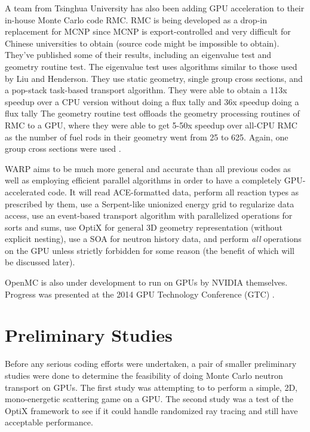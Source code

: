 A team from Tsinghua University has also been adding GPU acceleration to their in-house Monte Carlo code RMC. RMC is being developed as a drop-in replacement for MCNP since MCNP is export-controlled and very difficult for Chinese universities to obtain (source code might be impossible to obtain).  They've published some of their results, including an eigenvalue test and geometry routine test.  The eigenvalue test uses algorithms similar to those used by Liu and Henderson.  They use static geometry, single group cross sections, and a pop-stack task-based transport algorithm.  They were able to obtain a 113x speedup over a CPU version without doing a flux tally and 36x speedup doing a flux tally \cite{qixu_ans_winter}   The geometry routine test offloads the geometry processing routines of RMC to a GPU, where they were able to get 5-50x speedup over all-CPU RMC as the number of fuel rods in their geometry went from 25 to 625.  Again, one group cross sections were used \cite{qixu}.

WARP aims to be much more general and accurate than all previous codes as well as employing efficient parallel algorithms in order to have a completely GPU-accelerated code.  It will read ACE-formatted data, perform all reaction types as prescribed by them, use a Serpent-like unionized energy grid to regularize data access, use an event-based transport algorithm with parallelized operations for sorts and sums, use OptiX for general 3D geometry representation (without explicit nesting), use a SOA for neutron history data, and perform \emph{all} operations on the GPU unless strictly forbidden for some reason (the benefit of which will be discussed later).
	
OpenMC is also under development to run on GPUs by NVIDIA themselves.  Progress was presented at the 2014 GPU Technology Conference (GTC) \cite{openmc_gtc}.

\section{Preliminary Studies}
\label{sec:prelim}

Before any serious coding efforts were undertaken, a pair of smaller preliminary studies were done to determine the feasibility of doing Monte Carlo neutron transport on GPUs.  The first study was attempting to to perform a simple, 2D, mono-energetic scattering game on a GPU.  The second study was a test of the OptiX framework to see if it could handle randomized ray tracing and still have acceptable performance.

